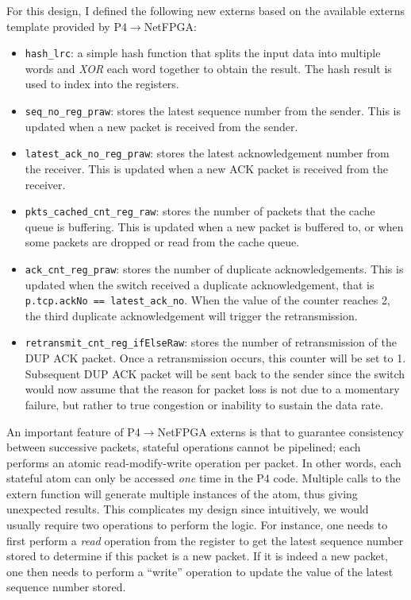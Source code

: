For this design, I defined the following new externs based on the available externs template provided by P4$\rightarrow$NetFPGA:
\begin{itemize}
	\item \verb|hash_lrc|: a simple hash function that splits the input data into multiple words and \textit{XOR} each word together to obtain the result. The hash result is used to index into the registers.
	\item \verb|seq_no_reg_praw|: stores the latest sequence number from the sender. This is updated when a new packet is received from the sender.
	\item \verb|latest_ack_no_reg_praw|: stores the latest acknowledgement number from the receiver. This is updated when a new ACK packet is received from the receiver. 
	\item \verb|pkts_cached_cnt_reg_raw|: stores the number of packets that the cache queue is buffering. This is updated when a new packet is buffered to, or when some packets are dropped or read from the cache queue.
	\item \verb|ack_cnt_reg_praw|: stores the number of duplicate acknowledgements. This is updated when the switch received a duplicate acknowledgement, that is \verb|p.tcp.ackNo == latest_ack_no|. When the value of the counter reaches 2, the third duplicate acknowledgement will trigger the retransmission.
	\item \verb|retransmit_cnt_reg_ifElseRaw|: stores the number of retransmission of the DUP ACK packet. Once a retransmission occurs, this counter will be set to 1. Subsequent DUP ACK packet will be sent back to the sender since the switch would now assume that the reason for packet loss is not due to a momentary failure, but rather to true congestion or inability to sustain the data rate.
\end{itemize}

An important feature of P4$\rightarrow$NetFPGA externs is that to guarantee consistency between successive packets, stateful operations cannot be pipelined; each performs an atomic read-modify-write operation per packet. In other words, each stateful atom can only be accessed \textit{one} time in the P4 code. Multiple calls to the extern function will generate multiple instances of the atom, thus giving unexpected results. This complicates my design since intuitively, we would usually require two operations to perform the logic. For instance, one needs to first perform a \textit{read} operation from the register to get the latest sequence number stored to determine if this packet is a new packet. If it is indeed a new packet, one then needs to perform a ``write'' operation to update the value of the latest sequence number stored.

